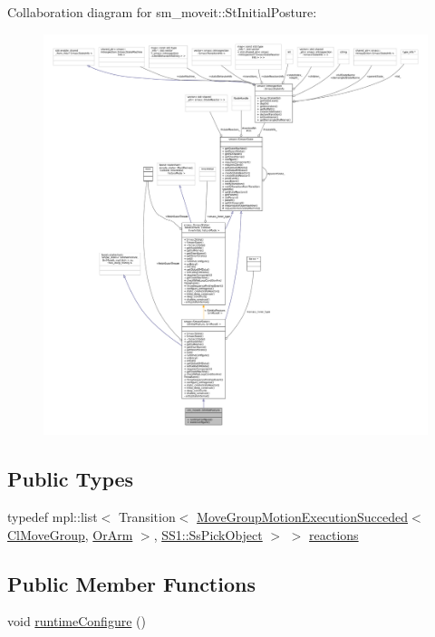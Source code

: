 Collaboration diagram for sm\+\_\+moveit\+:\+:St\+Initial\+Posture\+:
\nopagebreak
\begin{figure}[H]
\begin{center}
\leavevmode
\includegraphics[width=350pt]{structsm__moveit_1_1StInitialPosture__coll__graph}
\end{center}
\end{figure}
\subsection*{Public Types}
\begin{DoxyCompactItemize}
\item 
typedef mpl\+::list$<$ Transition$<$ \hyperlink{structsm__moveit_1_1cl__movegroup_1_1MoveGroupMotionExecutionSucceded}{Move\+Group\+Motion\+Execution\+Succeded}$<$ \hyperlink{classsm__moveit_1_1cl__movegroup_1_1ClMoveGroup}{Cl\+Move\+Group}, \hyperlink{classsm__moveit_1_1OrArm}{Or\+Arm} $>$, \hyperlink{structsm__moveit_1_1SS1_1_1SsPickObject}{S\+S1\+::\+Ss\+Pick\+Object} $>$ $>$ \hyperlink{structsm__moveit_1_1StInitialPosture_a7e2c958b8f5fd49c37b8b7e70e72bcaa}{reactions}
\end{DoxyCompactItemize}
\subsection*{Public Member Functions}
\begin{DoxyCompactItemize}
\item 
void \hyperlink{structsm__moveit_1_1StInitialPosture_af6985ad418eb655f35bd182973d7234a}{runtime\+Configure} ()
\end{DoxyCompactItemize}

